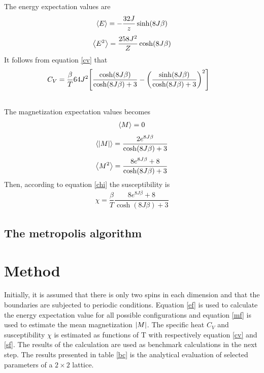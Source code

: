 \documentclass[%
reprint,nofootinbib,
amsmath,amssymb,
aps,
]{revtex4-1}
\begin{document}
The energy expectation values are \vspace{1mm}
\begin{align}
	\expval{E} = -\dfrac{32J}{z}\sinh(8J\beta)
\end{align}\vspace{1mm}
\begin{align}
	\expval{E^2} = \dfrac{258J^2}{Z}\cosh(8J\beta)
\end{align}\vspace{1mm}
It follows from equation \ref{cv} that \vspace{1mm}
\begin{align}
	C_V= \dfrac{\beta}{T}64J^2\qty[\dfrac{\cosh(8J\beta)}{\cosh(8J\beta) + 3}  -\qty(\dfrac{\sinh(8J\beta)}{\cosh(8J\beta) + 3 })^2]\nonumber  \\&\nonumber \\
\end{align}\vspace{1mm}
The magnetization expectation values becomes \vspace{1mm}
\begin{align*}
	\expval{M} =  0
\end{align*}\vspace{1mm}
\begin{align*}
\expval{\abs{M}} =  \dfrac{2e^{8J\beta}}{\cosh(8J\beta) + 3 }
\end{align*}\vspace{1mm}
\begin{align*}
\expval{M^2} = \dfrac{8e^{8J\beta} + 8}{\cosh(8J\beta) + 3}
\end{align*}\vspace{1mm}
Then, according to equation \ref{chi} the susceptibility is \vspace{1mm}
\begin{align}
	\chi = \dfrac{\beta}{T}\dfrac{8e^{8J\beta} + 8}{\cosh(8J\beta) + 3}
\end{align}
\subsection{The metropolis algorithm}

\section{Method} \noindent 
Initially, it is assumed that there is only two spins in each dimension and that the boundaries are subjected to periodic conditions. Equation \ref{ef} is used to calculate the energy expectation value for all possible configurations and equation \ref{mf} is used to estimate the mean magnetization $\abs{M}$. The specific heat $C_V$ and susceptibility $\chi$ is estimated as functions of T with respectively equation \ref{cv} and \ref{sf}. The results of the calculation are used as benchmark calculations in the next step. 
The results presented in table \ref{bc} is the analytical evaluation of selected parameters of a $2\times2$ lattice.
\newpage 
\end{document}
